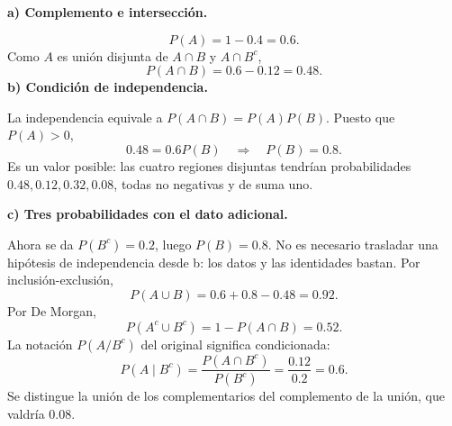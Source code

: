 \textbf{a) Complemento e intersección.}\par\nopagebreak[4]
\[
\boxed{P(A)=1-0.4=0.6.}
\]
Como $A$ es unión disjunta de $A\cap B$ y $A\cap B^c$,
\[
\boxed{P(A\cap B)=0.6-0.12=0.48.}
\]
\textbf{b) Condición de independencia.}\par\nopagebreak[4]
La independencia equivale a $P(A\cap B)=P(A)P(B)$. Puesto que $P(A)>0$,
\[
0.48=0.6P(B)\quad\Longrightarrow\quad\boxed{P(B)=0.8.}
\]
Es un valor posible: las cuatro regiones disjuntas tendrían probabilidades $0.48,0.12,0.32,0.08$, todas no negativas y de suma uno.

\textbf{c) Tres probabilidades con el dato adicional.}\par\nopagebreak[4]
Ahora se da $P(B^c)=0.2$, luego $P(B)=0.8$. No es necesario trasladar una hipótesis de independencia desde b: los datos y las identidades bastan.
Por inclusión-exclusión,
\[
\boxed{P(A\cup B)=0.6+0.8-0.48=0.92.}
\]
Por De Morgan,
\[
\boxed{P(A^c\cup B^c)=1-P(A\cap B)=0.52.}
\]
La notación $P(A/B^c)$ del original significa condicionada:
\[
\boxed{P(A\mid B^c)=\frac{P(A\cap B^c)}{P(B^c)}=\frac{0.12}{0.2}=0.6.}
\]
Se distingue la unión de los complementarios del complemento de la unión, que valdría $0.08$.
